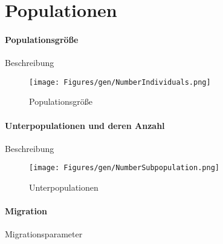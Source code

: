 \section{Populationen}\label{populations}


\paragraph{Populationsgröße}
Beschreibung





\begin{figure}[h!]
  \centering
  \texttt{[image: Figures/gen/NumberIndividuals.png]}
  \caption{Populationsgröße}\label{fig.numberindividuals}
\end{figure}


\paragraph{Unterpopulationen und deren Anzahl}
Beschreibung



\begin{figure}[h!]
  \centering
  \texttt{[image: Figures/gen/NumberSubpopulation.png]}
  \caption{Unterpopulationen}\label{fig.numbersubpopulation}
\end{figure}


\paragraph{Migration}
Migrationsparameter







